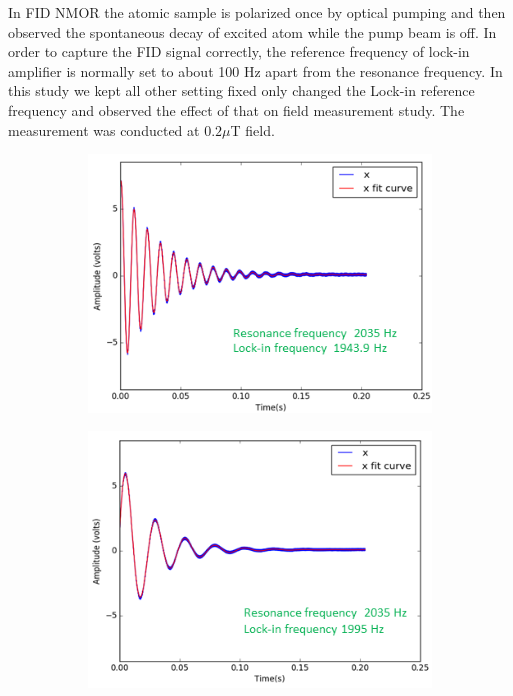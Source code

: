   In FID NMOR the atomic sample is polarized once by optical pumping and then observed the spontaneous decay of excited atom while the pump beam is off. In order to capture the FID signal correctly, the reference frequency of lock-in amplifier is normally set to about 100 Hz apart from the resonance frequency. In this study we kept all other setting fixed only changed the Lock-in reference frequency and observed the effect of that on field measurement study. The measurement was conducted at $0.2 \mu$T field. 
   \begin{figure}
    \centering
    \begin{subfigure}[b]{0.4\textwidth}
        \centering
        \includegraphics[width=\textwidth]{figures/reference_frequency1}
        \caption{}
        \label{fig:far from resonance}
    \end{subfigure}
    \hfill
    \begin{subfigure}[b]{0.4\textwidth}
        \centering
        \includegraphics[width=\textwidth]{figures/reference_frequency3}

\end{subfigure}
\end{figure}
